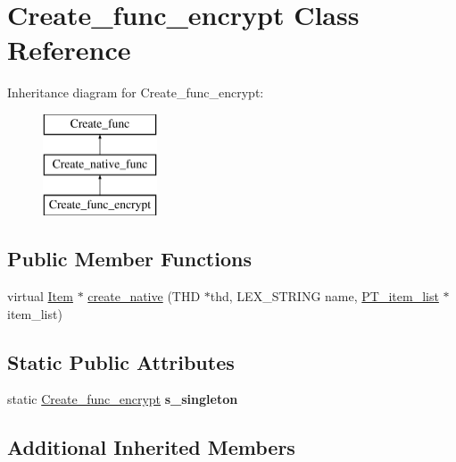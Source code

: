 \hypertarget{classCreate__func__encrypt}{}\section{Create\+\_\+func\+\_\+encrypt Class Reference}
\label{classCreate__func__encrypt}
Inheritance diagram for Create\+\_\+func\+\_\+encrypt\+:\begin{figure}[H]
\begin{center}
\leavevmode
\includegraphics[height=3.000000cm]{classCreate__func__encrypt}
\end{center}
\end{figure}
\subsection*{Public Member Functions}
\begin{DoxyCompactItemize}
\item 
virtual \mbox{\hyperlink{classItem}{Item}} $\ast$ \mbox{\hyperlink{classCreate__func__encrypt_a2111cf7426f1e501cee525d73f84f159}{create\+\_\+native}} (T\+HD $\ast$thd, L\+E\+X\+\_\+\+S\+T\+R\+I\+NG name, \mbox{\hyperlink{classPT__item__list}{P\+T\+\_\+item\+\_\+list}} $\ast$item\+\_\+list)
\end{DoxyCompactItemize}
\subsection*{Static Public Attributes}
\begin{DoxyCompactItemize}
\item 
\mbox{\label{classCreate__func__encrypt_aba711e7b592b397de9e79eda01a7c451}} 
static \mbox{\hyperlink{classCreate__func__encrypt}{Create\+\_\+func\+\_\+encrypt}} {\bfseries s\+\_\+singleton}
\end{DoxyCompactItemize}
\subsection*{Additional Inherited Members}



